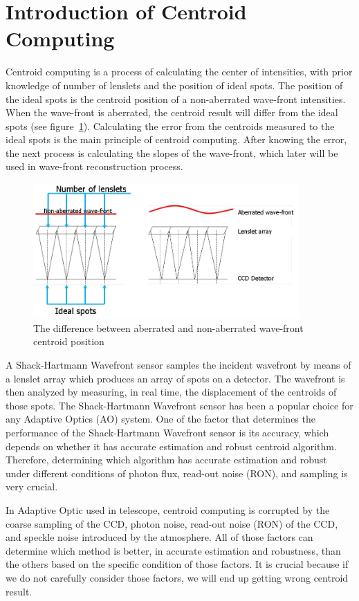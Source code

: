 \documentclass{article}
\begin{document}
\section{Introduction of Centroid Computing}

Centroid computing is a process of calculating the center of intensities, with prior knowledge of number of lenslets and the position of ideal spots. The position of the ideal spots is the centroid position of a non-aberrated wave-front intensities. When the wave-front is aberrated, the centroid result will differ from the ideal spots (see figure~\ref{fig:fig1}). Calculating the error from the centroids measured to the ideal spots is the main principle of centroid computing. After knowing the error, the next process is calculating the slopes of the wave-front, which later will be used in wave-front reconstruction process.

\begin{figure}[H]
    \centering
    \includegraphics[width=4in]{figures/fig1.jpg}
    \caption{The difference between aberrated and non-aberrated wave-front centroid position}
    \label{fig:fig1}
\end{figure}

A Shack-Hartmann Wavefront sensor samples the incident wavefront by means of a lenslet array which produces an array of spots on a detector. The wavefront is then analyzed by measuring, in real time, the displacement of the centroids of those spots. The Shack-Hartmann Wavefront sensor has been a popular choice for any Adaptive Optics (AO) system. One of the factor that determines the performance of the Shack-Hartmann Wavefront sensor is its accuracy, which depends on whether it has accurate estimation and robust centroid algorithm. Therefore, determining which algorithm has accurate estimation and robust under different conditions of photon flux, read-out noise (RON), and sampling is very crucial.

In Adaptive Optic used in telescope, centroid computing is corrupted by the coarse sampling of the CCD, photon noise, read-out noise (RON) of the CCD, and speckle noise introduced by the atmosphere. All of those factors can determine which method is better, in accurate estimation and robustness, than the others based on the specific condition of those factors. It is crucial because if we do not carefully consider those factors, we will end up getting wrong centroid result.
\end{document}
